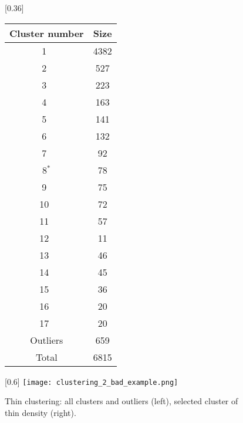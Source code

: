 \documentclass{llncs}
\begin{document}
\begin{figure}[ht!]
        \centering
        [0.36\textwidth]{
        \begin{tabular}{c|c}
            Cluster number &  Size  \\
            \hline
            1~ &  4382 \\
            2~ & 527 \\
            3~ & 223 \\
            4~ & 163 \\
            5~ & 141 \\
            6~ & 132 \\
            7~ & 92 \\
            8$^*$ & 78 \\
            9~ & 75 \\
            10~ & 72 \\
            11~ & 57 \\
            12~ & 11 \\
            13~ & 46 \\
            14~ & 45 \\
            15~ & 36 \\
            16~ & 20 \\
            17~ & 20 \\
            Outliers & 659\\
           \hline
            Total & 6815
        \end{tabular}
        }
    \hspace*{0.02\textwidth}
    [0.6\textwidth]{
    \texttt{[image: clustering\_2\_bad\_example.png]}
    }
    \caption{Thin clustering: all clusters and outliers (left), selected cluster of thin density (right). 
    \label{fig:relaxed-clust}}
\end{figure}

\end{document}
